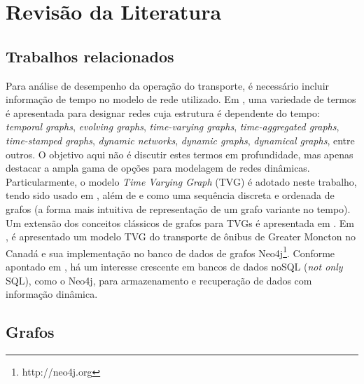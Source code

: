 
\chapter{Revisão da Literatura}\label{cap:revisaodaliteratura}

\section{Trabalhos relacionados} \label{sec:fund}

\textcolor{courb2020}{
Para análise de desempenho da operação do transporte, é necessário incluir informação de tempo no modelo de rede utilizado. Em \cite{hol:12}, uma variedade de termos é apresentada para designar redes cuja estrutura é dependente do tempo: \emph{temporal graphs}, \emph{evolving graphs}, \emph{time-varying graphs}, \emph{time-aggregated graphs}, \emph{time-stamped graphs}, \emph{dynamic networks}, \emph{dynamic graphs}, \emph{dynamical graphs}, entre outros. O objetivo aqui não é discutir estes termos em profundidade, mas apenas destacar a ampla gama de opções para modelagem de redes dinâmicas. Particularmente, o modelo \emph{Time Varying Graph} (TVG) é adotado neste trabalho, tendo sido usado em \cite{sant:09}, além de \cite{tang:10} e \cite{lat:10} como uma sequência discreta e ordenada de grafos (a forma mais intuitiva de representação de um grafo variante no tempo). Um extensão dos conceitos clássicos de grafos para TVGs é apresentada em \cite{lat:12}. Em \cite{wach:19}, é apresentado um modelo TVG do transporte de ônibus de Greater Moncton no Canadá e sua implementação no banco de dados de grafos Neo4j\footnote{http://neo4j.org}. Conforme apontado em \cite{vick:10}, há um interesse crescente em bancos de dados noSQL (\emph{not only} SQL), como o Neo4j, para armazenamento e recuperação de dados com informação dinâmica.
}


\section{Grafos} \label{sec:fund}

